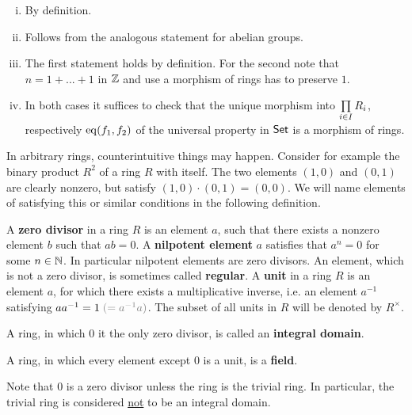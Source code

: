 	\begin{sketch}
		\begin{enumerate}[(i)]
			\item{
				By definition.
			}
			\item{
				Follows from the analogous statement for abelian groups.
			}
			\item{
				The first statement holds by definition. For the second note that $n = 1 + ... + 1$ in $\mathbb{Z}$ and use a morphism of rings has to preserve $1$.
			}
			\item{
				 In both cases it suffices to check that the unique morphism into $\prod \limits_{i \in I} R_i$, respectively $\operatorname{eq}(f_1,f_2)$ of the universal property in $\textsf{Set}$ is a morphism of rings.
			}
		\end{enumerate}\vspace{-2em}
	\end{sketch}

	In arbitrary rings, counterintuitive things may happen. Consider for example the binary product $R^2$ of a ring $R$ with itself. The two elements $(1,0)$ and $(0,1)$ are clearly nonzero, but satisfy $(1,0)\cdot(0,1) = (0,0)$. We will name elements of satisfying this or similar conditions in the following definition.

	\begin{definition}
		A \textbf{zero divisor} in a ring $R$ is an element $a$, such that there exists a nonzero element $b$ such that $ab = 0$. A \textbf{nilpotent element} $a$ satisfies that $a^n = 0$ for some $n \in \mathbb{N}$. In particular nilpotent elements are zero divisors.
		An element, which is not a zero divisor, is sometimes called \textbf{regular}. A \textbf{unit} in a ring $R$ is an element $a$, for which there exists a multiplicative inverse, i.e. an element $a^{-1}$ satisfying $aa^{-1} = 1 \;{\color{gray}(= a^{-1}a)}$.
		The subset of all units in $R$ will be denoted by $R^\times$. 

		A ring, in which $0$ it the only zero divisor, is called an \textbf{integral domain}.

		A ring, in which every element except $0$ is a unit, is a \textbf{field}.
	\end{definition}

	Note that $0$ is a zero divisor unless the ring is the trivial ring. In particular, the trivial ring is considered \underline{not} to be an integral domain.

